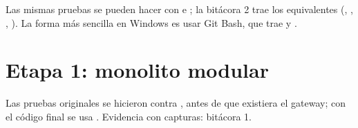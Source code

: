 \documentclass[11pt]{article}
\begin{document}
\begin{nota}[En PowerShell]
Las mismas pruebas se pueden hacer con  e ; la bitácora 2 trae
los equivalentes (, , , ). La forma más sencilla en
Windows es usar Git Bash, que trae  y .
\end{nota}

\section{Etapa 1: monolito modular}

Las pruebas originales se hicieron contra , antes de que existiera el gateway; con
el código final se usa . Evidencia con capturas: bitácora 1.
\end{document}
